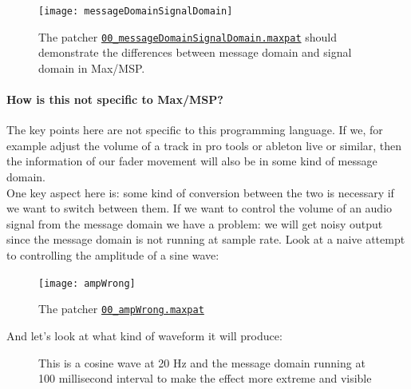 \begin{figure}[h!]
	\centering
	\texttt{[image: messageDomainSignalDomain]}
	\caption[message domain vs. signal domain]
	{The patcher \href{./patchers/00\_introduction/00\_messageDomainSignalDomain.maxpat}{\texttt{00\_messageDomainSignalDomain.maxpat}} should demonstrate the differences between message domain and signal domain in Max/MSP.}
	\label{fig:mesSig}
\end{figure}

\paragraph{How is this not specific to Max/MSP?} The key points here are not specific to this programming language. If we, for example adjust the volume of a track in pro tools or ableton live or similar, then the information of our fader movement will also be in some kind of message domain.\\
One key aspect here is: some kind of conversion between the two is necessary if we want to switch between them. If we want to control the volume of an audio signal from the message domain we have a problem: we will get noisy output since the message domain is not running at sample rate. Look at a naive attempt to controlling the amplitude of a sine wave:



\begin{figure}[H]
	\centering
	\texttt{[image: ampWrong]}
	\caption[patcher \texttt{00\_ampWrong.maxpat}]
	{The patcher \href{./patchers/00\_introduction/00\_ampWrong.maxpat}{\texttt{00\_ampWrong.maxpat}}}
	\label{fig:ampWrongRight}
\end{figure}


And let's look at what kind of waveform it will produce:

\begin{figure}[H]
	\centering
	
	\caption[Amplitude control, message domain ]
	{This is a cosine wave at 20 Hz and the message domain running at 100 millisecond interval to make the effect more extreme and visible}
	\label{fig:msgDomainAmpControl}
\end{figure}


